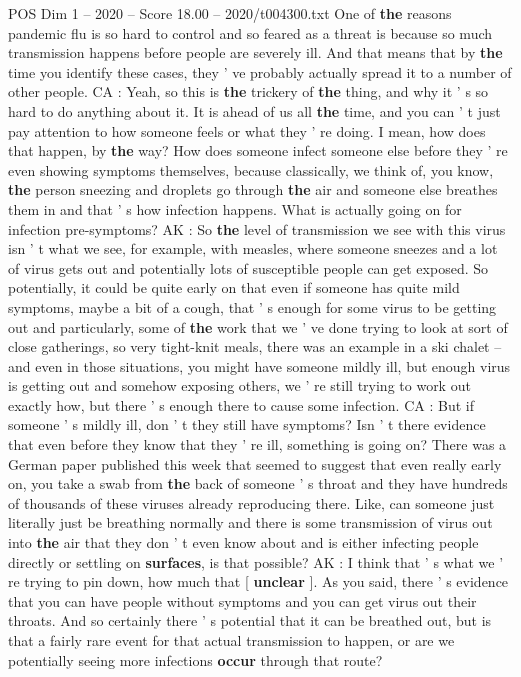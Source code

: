 \begin{textsample}{POS Dim 1 – 2020 – Score 18.00 – 2020/t004300.txt}
One of \textbf{the} reasons pandemic flu is so hard to control and so feared as a threat is because so much transmission happens before people are severely ill.
And that means that by \textbf{the} time you identify these cases, they ' ve probably actually spread it to a number of other people.
CA : Yeah, so this is \textbf{the} trickery of \textbf{the} thing, and why it ' s so hard to do anything about it.
It is ahead of us all \textbf{the} time, and you can ' t just pay attention to how someone feels or what they ' re doing.
I mean, how does that happen, by \textbf{the} way?
How does someone infect someone else before they ' re even showing symptoms themselves, because classically, we think of, you know, \textbf{the} person sneezing and droplets go through \textbf{the} air and someone else breathes them in and that ' s how infection happens.
What is actually going on for infection pre-symptoms?
AK : So \textbf{the} level of transmission we see with this virus isn ' t what we see, for example, with measles, where someone sneezes and a lot of virus gets out and potentially lots of susceptible people can get exposed.
So potentially, it could be quite early on that even if someone has quite mild symptoms, maybe a bit of a cough, that ' s enough for some virus to be getting out and particularly, some of \textbf{the} work that we ' ve done trying to look at sort of close gatherings, so very tight-knit meals, there was an example in a ski chalet -- and even in those situations, you might have someone mildly ill, but enough virus is getting out and somehow exposing others, we ' re still trying to work out exactly how, but there ' s enough there to cause some infection.
CA : But if someone ' s mildly ill, don ' t they still have symptoms?
Isn ' t there evidence that even before they know that they ' re ill, something is going on?
There was a German paper published this week that seemed to suggest that even really early on, you take a swab from \textbf{the} back of someone ' s throat and they have hundreds of thousands of these viruses already reproducing there.
Like, can someone just literally just be breathing normally and there is some transmission of virus out into \textbf{the} air that they don ' t even know about and is either infecting people directly or settling on \textbf{surfaces}, is that possible?
AK : I think that ' s what we ' re trying to pin down, how much that [ \textbf{unclear} ].
As you said, there ' s evidence that you can have people without symptoms and you can get virus out their throats.
And so certainly there ' s potential that it can be breathed out, but is that a fairly rare event for that actual transmission to happen, or are we potentially seeing more infections \textbf{occur} through that route?

\end{textsample}
